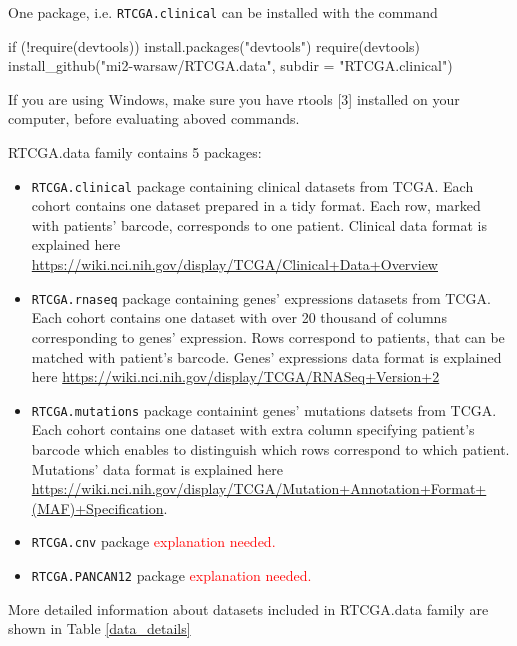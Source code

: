 One package, i.e. \texttt{RTCGA.clinical} can be installed with the
command

\begin{Schunk}
\begin{Sinput}
if (!require(devtools)) {
    install.packages("devtools")
    require(devtools)
}
install_github("mi2-warsaw/RTCGA.data", 
                subdir = "RTCGA.clinical") 
\end{Sinput}
\end{Schunk}

If you are using Windows, make sure you have rtools {[}3{]} installed on
your computer, before evaluating aboved commands.

RTCGA.data family contains 5 packages:

\begin{itemize}
\itemsep1pt\parskip0pt
\item
  \texttt{RTCGA.clinical} package containing clinical datasets from
  TCGA. Each cohort contains one dataset prepared in a tidy format. Each
  row, marked with patients' barcode, corresponds to one patient.
  Clinical data format is explained here
  \url{https://wiki.nci.nih.gov/display/TCGA/Clinical+Data+Overview}
\item
  \texttt{RTCGA.rnaseq} package containing genes' expressions datasets
  from TCGA. Each cohort contains one dataset with over 20 thousand of
  columns corresponding to genes' expression. Rows correspond to
  patients, that can be matched with patient's barcode. Genes'
  expressions data format is explained here
  \url{https://wiki.nci.nih.gov/display/TCGA/RNASeq+Version+2}
\item
  \texttt{RTCGA.mutations} package containint genes' mutations datsets
  from TCGA. Each cohort contains one dataset with extra column
  specifying patient's barcode which enables to distinguish which rows
  correspond to which patient. Mutations' data format is explained here
  \url{https://wiki.nci.nih.gov/display/TCGA/Mutation+Annotation+Format+(MAF)+Specification}.
\item
  \texttt{RTCGA.cnv} package \textcolor{red}{ explanation needed.}
\item
  \texttt{RTCGA.PANCAN12} package \textcolor{red}{ explanation needed.}
\end{itemize}

More detailed information about datasets included in RTCGA.data family
are shown in Table \ref{data_details}

\tiny

